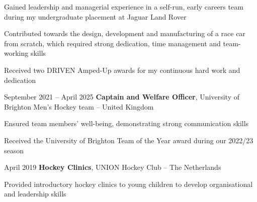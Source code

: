 	\vspace{0.10 cm}
	\begin{onecolentry}
		\begin{highlights}
			\item Gained leadership and managerial experience in a self-run, early careers team during my undergraduate placement at Jaguar Land Rover
			\item Contributed towards the design, development and manufacturing of a race car from scratch, which required strong dedication, time management and team-working skills
			\item Received two DRIVEN Amped-Up awards for my continuous hard work and dedication
		\end{highlights}
	\end{onecolentry}
	
	\vspace{0.2 cm}
	
	\begin{twocolentry}{
			September 2021 – April 2025
		}
		\textbf{Captain and Welfare Officer}, University of Brighton Men’s Hockey team -- United Kingdom\end{twocolentry}
	
	\vspace{0.10 cm}
	\begin{onecolentry}
		\begin{highlights}
			\item Ensured team members’ well-being, demonstrating strong communication skills
			\item Received the University of Brighton Team of the Year award during our 2022/23 season
		\end{highlights}
	\end{onecolentry}
	
	\vspace{0.2 cm}
	
	\begin{twocolentry}{
			April 2019
		}
		\textbf{Hockey Clinics}, UNION Hockey Club -- The Netherlands\end{twocolentry}
	
	\vspace{0.10 cm}
	\begin{onecolentry}
		\begin{highlights}
			\item Provided introductory hockey clinics to young children to develop organisational and leadership skills
		\end{highlights}
	\end{onecolentry}

